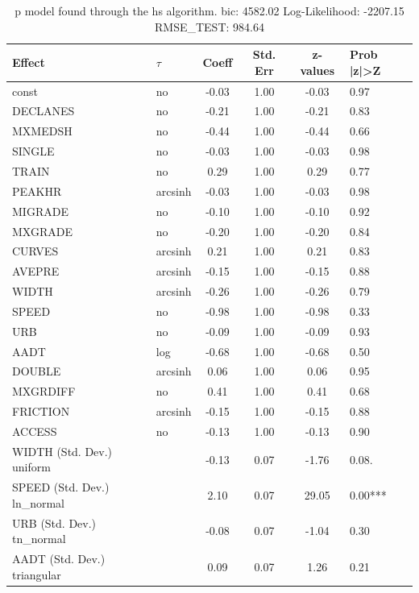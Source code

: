 \begin{table}
	\caption{p model found through the hs algorithm. bic: 4582.02 Log-Likelihood: -2207.15 RMSE_TEST: 984.64}
	\begin{center}
		\begin{tabular}{|l|l|c|c|c|l|}
			\hline
			Effect & $\tau$ & Coeff & Std. Err & z-values & Prob |z|>Z \\
			\hline
			const & no & -0.03 & 1.00 & -0.03 & 0.97 \\
			\hline
			DECLANES & no & -0.21 & 1.00 & -0.21 & 0.83 \\
			\hline
			MXMEDSH & no & -0.44 & 1.00 & -0.44 & 0.66 \\
			\hline
			SINGLE & no & -0.03 & 1.00 & -0.03 & 0.98 \\
			\hline
			TRAIN & no & 0.29 & 1.00 & 0.29 & 0.77 \\
			\hline
			PEAKHR & arcsinh & -0.03 & 1.00 & -0.03 & 0.98 \\
			\hline
			MIGRADE & no & -0.10 & 1.00 & -0.10 & 0.92 \\
			\hline
			MXGRADE & no & -0.20 & 1.00 & -0.20 & 0.84 \\
			\hline
			CURVES & arcsinh & 0.21 & 1.00 & 0.21 & 0.83 \\
			\hline
			AVEPRE & arcsinh & -0.15 & 1.00 & -0.15 & 0.88 \\
			\hline
			WIDTH & arcsinh & -0.26 & 1.00 & -0.26 & 0.79 \\
			\hline
			SPEED & no & -0.98 & 1.00 & -0.98 & 0.33 \\
			\hline
			URB & no & -0.09 & 1.00 & -0.09 & 0.93 \\
			\hline
			AADT & log & -0.68 & 1.00 & -0.68 & 0.50 \\
			\hline
			DOUBLE & arcsinh & 0.06 & 1.00 & 0.06 & 0.95 \\
			\hline
			MXGRDIFF & no & 0.41 & 1.00 & 0.41 & 0.68 \\
			\hline
			FRICTION & arcsinh & -0.15 & 1.00 & -0.15 & 0.88 \\
			\hline
			ACCESS & no & -0.13 & 1.00 & -0.13 & 0.90 \\
			\hline
			WIDTH (Std. Dev.) uniform &  & -0.13 & 0.07 & -1.76 & 0.08. \\
			\hline
			SPEED (Std. Dev.) ln_normal &  & 2.10 & 0.07 & 29.05 & 0.00*** \\
			\hline
			URB (Std. Dev.) tn_normal &  & -0.08 & 0.07 & -1.04 & 0.30 \\
			\hline
			AADT (Std. Dev.) triangular &  & 0.09 & 0.07 & 1.26 & 0.21 \\

\end{tabular}
\end{center}
\end{table}
